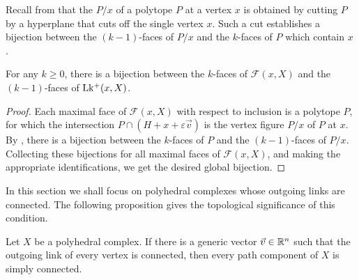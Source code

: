 Recall from \cite[Sec.~2.1]{Ziegler95} that the  $P/x$ of a polytope $P$ at a vertex $x$ is obtained by cutting $P$ by a hyperplane that cuts off the single vertex $x$. 
Such a cut establishes a bijection between the $(k-1)$-faces of $P/x$ and the $k$-faces of $P$ which contain $x$ \cite[Prop.~2.4]{Ziegler95}.

\begin{lemma}
    \label{l:vertex-figure}
    For any $k\geq 0$, there is a bijection between the $k$-faces of $\mathcal{F}(x,X)$ and the $(k-1)$-faces of $\operatorname{Lk^{+}}(x,X)$.
\end{lemma}
\begin{proof}
    Each maximal face of $\mathcal{F}(x,X)$ with respect to inclusion is a polytope $P$, for which the intersection $P \cap (H+x+\varepsilon \vec v)$ is the vertex figure $P/x$ of $P$ at $x$. 
    By \cite[Prop.~2.4]{Ziegler95}, there is a bijection between the $k$-faces of $P$ and the $(k-1)$-faces of $P/x$.
    Collecting these bijections for all maximal faces of $\mathcal{F}(x,X)$, and making the appropriate identifications, we get the desired global bijection.
\end{proof}

In this section we shall focus on polyhedral complexes whose outgoing links are connected. 
The following proposition gives the topological significance of this condition.

\begin{proposition}
    \label{lemma:outgoing-link}
    Let $X$ be a polyhedral complex.
    If there is a generic vector $\vec v \in \mathbb R^n$ such that the outgoing link of every vertex is connected, then every path component of $X$ is simply connected.
\end{proposition}

